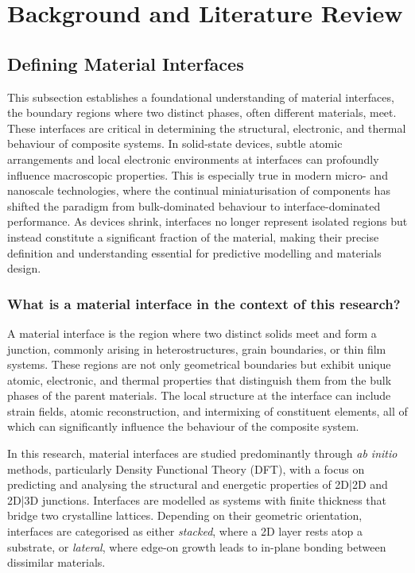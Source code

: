 \chapter{Background and Literature Review}
\label{chapter:background}

\section{Defining Material Interfaces}
\label{section:material_interfaces}

This subsection establishes a foundational understanding of material interfaces, the boundary regions where two
distinct phases, often different materials, meet. These interfaces are critical in determining the structural,
electronic, and thermal behaviour of composite systems. In solid-state devices, subtle atomic arrangements and local
electronic environments at interfaces can profoundly influence macroscopic properties. This is especially true in
modern micro- and nanoscale technologies, where the continual miniaturisation of components has shifted the paradigm
from bulk-dominated behaviour to interface-dominated performance. As devices shrink, interfaces no longer represent
isolated regions but instead constitute a significant fraction of the material, making their precise definition and
understanding essential for predictive modelling and materials design.

\subsection{What is a material interface in the context of this research?}

A material interface is the region where two distinct solids meet and form a junction, commonly arising in
heterostructures, grain boundaries, or thin film systems. These regions are not only geometrical boundaries but
exhibit unique atomic, electronic, and thermal properties that distinguish them from the bulk phases of the parent
materials. The local structure at the interface can include strain fields, atomic reconstruction, and intermixing of
constituent elements, all of which can significantly influence the behaviour of the composite system.

In this research, material interfaces are studied predominantly through \textit{ab initio} methods, particularly
Density Functional Theory (DFT), with a focus on predicting and analysing the structural and energetic properties of
2D|2D and 2D|3D junctions. Interfaces are modelled as systems with finite thickness that bridge two crystalline
lattices. Depending on their geometric orientation, interfaces are categorised as either \emph{stacked}, where a 2D
layer rests atop a substrate, or \emph{lateral}, where edge-on growth leads to in-plane bonding between dissimilar
materials.

